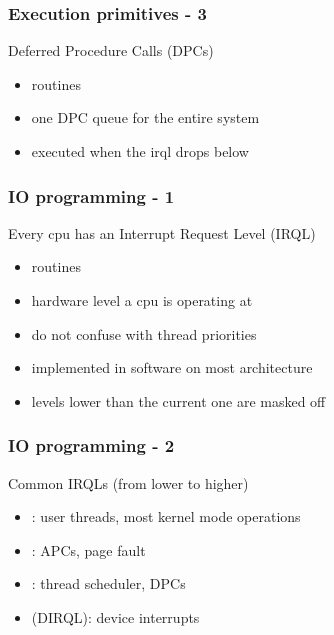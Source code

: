 
\begin{frame}
 \frametitle{Execution primitives - 3}

 Deferred Procedure Calls (DPCs)

 \begin{itemize}
  \item {} routines
  \item one DPC queue for the entire system
  \item executed when the irql drops below 
 \end{itemize}

\end{frame}


\begin{frame}
 \frametitle{IO programming - 1}

 Every cpu has an Interrupt Request Level (IRQL)

 \begin{itemize}
  \item {} routines
  \item hardware level a cpu is operating at
  \item do not confuse with thread priorities
  \item implemented in software on most architecture
  \item levels lower than the current one are masked off
 \end{itemize}

\end{frame}


\begin{frame}
 \frametitle{IO programming - 2}

 Common IRQLs (from lower to higher)

 \begin{itemize}
  \item {}: user threads, most kernel mode operations
  \item {}: APCs, page fault
  \item {}: thread scheduler, DPCs
  \item {}(DIRQL): device interrupts
 \end{itemize}

\end{frame}

